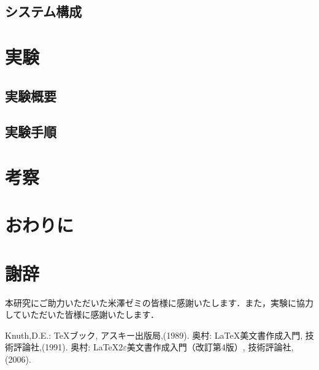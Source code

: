 \documentclass[a4paper,dvipdfmx]{hisken}
\begin{document}
\subsection{システム構成}


\section{実験}
\subsection{実験概要}

\subsection{実験手順}




\section{考察}


\section{おわりに}

\section*{謝辞}
本研究にご助力いただいた米澤ゼミの皆様に感謝いたします．また，実験に協力していただいた皆様に感謝いたします．

\begin{thebibliography}{99}
	Knuth,D.E.:
	\TeX{}ブック,
	アスキー出版局,(1989).
	奥村:
	\LaTeX{}美文書作成入門,
	技術評論社,(1991).
    奥村:
    \LaTeX2$\varepsilon$美文書作成入門（改訂第4版）,
    技術評論社,(2006).
\end{thebibliography}





\end{document}
